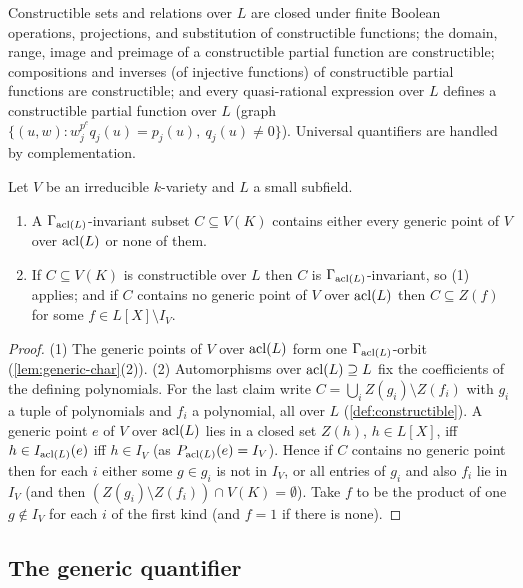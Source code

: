 \begin{corollary}\label{cor:constructible-closure}
Constructible sets and relations over $L$ are closed under finite Boolean operations,
projections, and substitution of constructible functions; the domain, range, image and
preimage of a constructible partial function are constructible; compositions and
inverses (of injective functions) of constructible partial functions are constructible;
and every quasi-rational expression over $L$ defines a constructible partial function
over $L$ (graph $\{(u,w): w_j^{p^e}q_j(u)=p_j(u),\ q_j(u)\ne0\}$).  Universal quantifiers
are handled by complementation.
\end{corollary}

\begin{lemma}\label{lem:gen-constructible}
Let $V$ be an irreducible $k$-variety and $L$ a small subfield.
\begin{enumerate}[nosep]
\item A $\Gamma_{\operatorname{acl}(L)}$-invariant subset $C\subseteq V(K)$ contains either every generic
  point of $V$ over $\operatorname{acl}(L)$ or none of them.
\item If $C\subseteq V(K)$ is constructible over $L$ then $C$ is $\Gamma_{\operatorname{acl}(L)}$-invariant,
  so (1) applies; and if $C$ contains no generic point of $V$ over $\operatorname{acl}(L)$ then
  $C\subseteq Z(f)$ for some $f\in L[X]\setminus I_V$.
\end{enumerate}
\end{lemma}
\begin{proof}
(1) The generic points of $V$ over $\operatorname{acl}(L)$ form one $\Gamma_{\operatorname{acl}(L)}$-orbit
(\cref{lem:generic-char}(2)).  (2) Automorphisms over $\operatorname{acl}(L)\supseteq L$ fix the
coefficients of the defining polynomials.  For the last claim write
$C=\bigcup_i Z(g_i)\setminus Z(f_i)$ with $g_i$ a tuple of polynomials and $f_i$ a
polynomial, all over $L$ (\cref{def:constructible}).  A generic point $e$ of $V$ over
$\operatorname{acl}(L)$ lies in a closed set $Z(h)$, $h\in L[X]$, iff $h\in I_{\operatorname{acl}(L)}(e)$ iff
$h\in I_V$ (as $P_{\operatorname{acl}(L)}(e)=I_V$).  Hence if $C$ contains no generic point then for
each $i$ either some $g\in g_i$ is not in $I_V$, or all entries of $g_i$ and also $f_i$
lie in $I_V$ (and then $(Z(g_i)\setminus Z(f_i))\cap V(K)=\emptyset$).  Take $f$ to be the
product of one $g\notin I_V$ for each $i$ of the first kind (and $f=1$ if there is none).
\end{proof}

\subsection{The generic quantifier}

